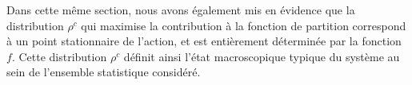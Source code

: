 Dans cette même section, nous avons également mis en évidence que la distribution \( \rho^c \) qui maximise la contribution à la fonction de partition correspond à un point stationnaire de l'action, et est entièrement déterminée par la fonction \( f \). Cette distribution \( \rho^c \) définit ainsi l’état macroscopique typique du système au sein de l’ensemble statistique considéré.

{\color{blue} 







}
